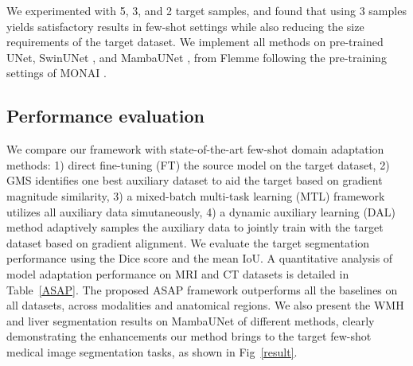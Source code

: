 We experimented with 5, 3, and 2 target samples, and found that using 3 samples yields satisfactory results in few-shot settings while also reducing the size requirements of the target dataset.
We implement all methods on pre-trained UNet\cite{ronneberger2015u}, SwinUNet \cite{cao2022swin}, and MambaUNet \cite{wang2024mamba}, from Flemme \cite{zhang2024flemme} following the pre-training settings of
MONAI \cite{cardoso2022monai}.
\vspace{-0.2cm}
\subsection{Performance evaluation}
\vspace{-0.1cm}


We compare our framework with state-of-the-art few-shot domain adaptation methods: %
1) direct fine-tuning (FT) the source model on the target dataset,
2) GMS \cite{yu2020gradient} identifies one best auxiliary dataset to aid the target based on gradient magnitude similarity,
3) a mixed-batch multi-task learning (MTL) framework \cite{graham2023one} utilizes all auxiliary data simutaneously,
4) a dynamic auxiliary learning (DAL) method \cite{albalak2024improving} adaptively samples the auxiliary data to jointly train with the target dataset based on gradient alignment.
We evaluate the target segmentation performance using the Dice score and the mean IoU. 
A quantitative analysis of model adaptation performance on MRI and CT datasets is detailed in Table~\ref{ASAP}.
The proposed ASAP framework outperforms all the baselines on all datasets, across modalities and anatomical regions. 
We also present the WMH and liver segmentation results on MambaUNet of different methods, clearly demonstrating
the enhancements our method brings to the target few-shot medical image
segmentation tasks, as shown in Fig~\ref{result}.

